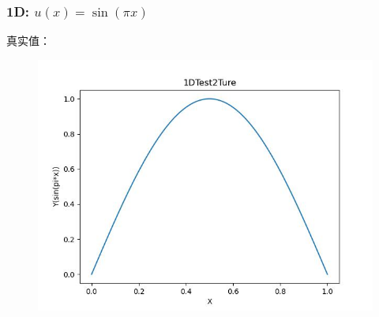 \documentclass{article}
\begin{document}
\subsubsection{1D: $u(x)=\sin(\pi x)$}
真实值：
\begin{figure}[h]
    \centering
    \includegraphics[width=0.7\linewidth]{1DTest2Ture.jpg}
\end{figure}
\end{document}
